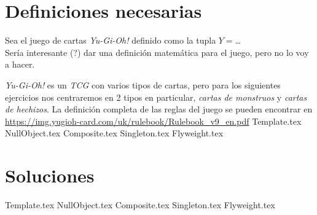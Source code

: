 \section{Definiciones necesarias}
  Sea el juego de cartas \textit{Yu-Gi-Oh!} definido como la tupla 
  $Y = $\dots\\
  Sería interesante (?) dar una definición matemática para el juego, pero no lo voy a 
  hacer.

  \textit{Yu-Gi-Oh!} es un \textit{TCG} con varios tipos de cartas, pero para los 
  siguientes ejercicios nos centraremos en 2 tipos en particular, \textit{cartas de 
  monstruos} y \textit{cartas de hechizos}.
  La definición completa de las reglas del juego se pueden encontrar en 
  \url{https://img.yugioh-card.com/uk/rulebook/Rulebook_v9_en.pdf}
%
{Template.tex} 
{NullObject.tex}
{Composite.tex}
{Singleton.tex}
{Flyweight.tex}

\pagebreak
\section{Soluciones}
  {Template.tex}
  {NullObject.tex}
  {Composite.tex}
  {Singleton.tex}
  \pagebreak
  {Flyweight.tex}

%